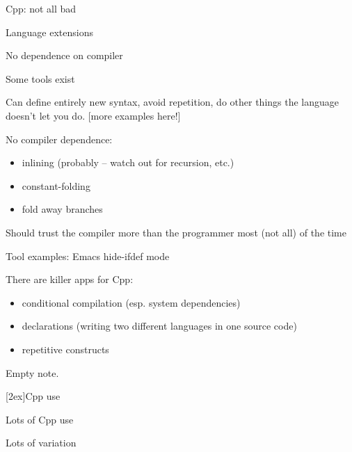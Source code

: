 \documentclass{slides}
\def\slidetitle#1{\begin{center}\large #1 \end{center}}
\def\raisedslidetitle#1{\centerline{\raisebox{1.5in}[2ex]{\large #1}}}
\begin{document}
\begin{slide}
\slidetitle{Cpp: not all bad}

Language extensions

No dependence on compiler

Some tools exist
\end{slide}

\begin{note}
Can define entirely new syntax, avoid repetition, do other things the
language doesn't let you do.  [more examples here!]

No compiler dependence:
\vspace{-.5in}
\begin{itemize}\itemsep 0pt \parskip 0pt
\item inlining (probably -- watch out for recursion, etc.)
\item constant-folding
\item fold away branches
\end{itemize}
Should trust the compiler more than the programmer most (not all) of the time

Tool examples: Emacs hide-ifdef mode

There are killer apps for Cpp: 
\vspace{-.5in}
\begin{itemize}\itemsep 0pt \parskip 0pt
 \item conditional compilation (esp. system dependencies)
 \item declarations (writing two different languages in one source code)
 \item repetitive constructs
\end{itemize}

\end{note}


\begin{slide}
\outlineslidebody
\end{slide}

\begin{note}
Empty note.
\end{note}


\begin{slide}
\raisedslidetitle{Cpp use}

\centerline{}

Lots of Cpp use

Lots of variation
\end{slide}
\end{document}
